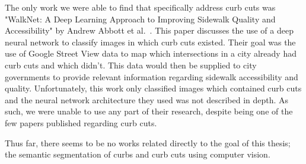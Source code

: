 The only work we were able to find that specifically address curb cuts was "WalkNet: A Deep Learning Approach to Improving Sidewalk Quality and Accessibility" by Andrew Abbott et al.~\cite{walknet}.
This paper discusses the use of a deep neural network to classify images in which curb cuts existed.
Their goal was the use of Google Street View data to map which intersections in a city already had curb cuts and which didn't.
This data would then be supplied to city governments to provide relevant information regarding sidewalk accessibility and quality.
Unfortunately, this work only classified images which contained curb cuts and the neural network architecture they used was not described in depth.
As such, we were unable to use any part of their research, despite being one of the few papers published regarding curb cuts.

Thus far, there seems to be no works related directly to the goal of this thesis; the semantic segmentation of curbs and curb cuts using computer vision.
